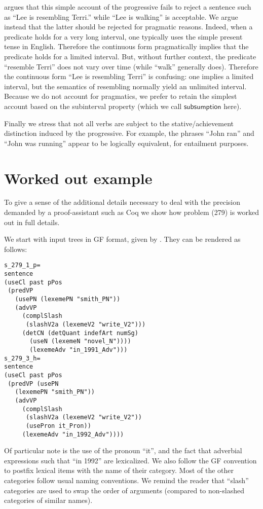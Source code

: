 \documentclass[11pt,a4paper]{article}
\newcommand\constant[1]{\mathsf{#1}}
\begin{document}
 argues that this simple account of the
progressive fails to reject a sentence such as ``Lee is resembling
Terri.'' while ``Lee is walking'' is acceptable. We argue instead that
the latter should be rejected for pragmatic reasons. Indeed, when a
predicate holds for a very long interval, one typically uses the
simple present tense in English. Therefore the continuous form
pragmatically implies that the predicate holds for a limited interval.
But, without further context, the predicate ``resemble Terri'' does
not vary over time (while ``walk'' generally does). Therefore the
continuous form ``Lee is resembling Terri'' is confusing: one implies
a limited interval, but the semantics of resembling normally yield an unlimited interval.
%
Because we do not account for pragmatics, we prefer to retain the
simplest account based on the subinterval property (which we call
$\constant{subsumption}$ here).

Finally we stress that not all verbs are subject to the
stative/achievement distinction induced by the progressive. For
example, the phrases ``John ran'' and ``John was running'' appear to
be logically equivalent, for entailment purposes.


\section{Worked out example}
To give a sense of the additional details necessary to deal with the
precision demanded by a proof-assistant such as Coq we show how
problem (279) is worked out in full details.

We start with input trees in GF format, given by
\citet{Ljunglof:2012}. They can be rendered as follows:

\begin{small}
\begin{verbatim}
s_279_1_p=
sentence
(useCl past pPos
 (predVP
   (usePN (lexemePN "smith_PN"))
   (advVP
     (complSlash
      (slashV2a (lexemeV2 "write_V2")))
     (detCN (detQuant indefArt numSg)
       (useN (lexemeN "novel_N"))))
       (lexemeAdv "in_1991_Adv")))
s_279_3_h=
sentence
(useCl past pPos
 (predVP (usePN
   (lexemePN "smith_PN"))
   (advVP
     (complSlash
      (slashV2a (lexemeV2 "write_V2"))
      (usePron it_Pron))
     (lexemeAdv "in_1992_Adv"))))
\end{verbatim}
\end{small}

Of particular note is the use of the pronoun ``it'', and the fact that
adverbial expressions such that ``in 1992'' are lexicalized.  We also
follow the GF convention to postfix lexical items with the name of
their category. Most of the other categories follow usual naming
conventions. We remind the reader that ``slash'' categories are used
to swap the order of arguments (compared to non-slashed categories of
similar names).
\end{document}
